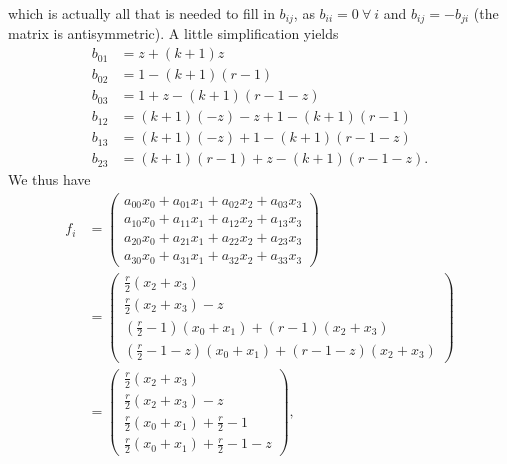 \documentclass[13pt]{amsart}
\begin{document}
which is actually all that is needed to fill in $b_{ij}$, as $b_{ii} = 0 ~ \forall ~ i$ and $b_{ij} = -b_{ji}$ (the matrix is antisymmetric).
A little simplification yields
\begin{equation}
    \begin{split}
        b_{01} & = z + (k+1)z \\
        b_{02} & = 1 - (k+1)(r-1) \\
        b_{03} & = 1 + z - (k+1)(r - 1 - z) \\
        b_{12} & = (k+1)(-z) - z + 1 - (k+1)(r-1)\\
        b_{13} & = (k+1)(-z) + 1 - (k+1)(r - 1 - z)\\
        b_{23} & = (k+1)(r-1) + z - (k+1)(r - 1 - z).
    \end{split}
\end{equation}
We thus have
\begin{equation}
    \begin{split}
        f_i & =
        \begin{pmatrix}
            a_{00}x_0 + a_{01}x_1 + a_{02}x_2 + a_{03}x_3\\
            a_{10}x_0 + a_{11}x_1 + a_{12}x_2 + a_{13}x_3\\
            a_{20}x_0 + a_{21}x_1 + a_{22}x_2 + a_{23}x_3\\
            a_{30}x_0 + a_{31}x_1 + a_{32}x_2 + a_{33}x_3
        \end{pmatrix}
        \\
        & =
        \begin{pmatrix}
            \frac{r}{2}(x_2 + x_3)\\
            \frac{r}{2}(x_2 + x_3) - z\\
            (\frac{r}{2} - 1)(x_0 + x_1) + (r-1)(x_2 + x_3)\\
            (\frac{r}{2} - 1 - z)(x_0 + x_1) + (r - 1 - z)(x_2 + x_3)
        \end{pmatrix}
        \\
        & =
        \begin{pmatrix}
            \frac{r}{2}(x_2 + x_3)\\
            \frac{r}{2}(x_2 + x_3) - z\\
            \frac{r}{2}(x_0 + x_1) + \frac{r}{2} - 1\\
            \frac{r}{2}(x_0 + x_1) + \frac{r}{2} - 1 - z
        \end{pmatrix},
    \end{split}
\end{equation}
\end{document}
